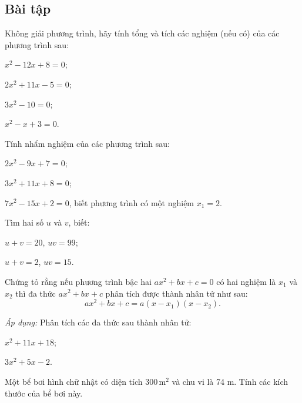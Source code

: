 \begin{exercises}
    \subsection{Bài tập}

    \begin{questions}[resume=SGK]
        \item Không giải phương trình, hãy tính tổng và tích các nghiệm (nếu có) của các phương trình sau:
        \begin{questions}
            \item $x^2-12x+8=0$;
            \item $2x^2+11x-5=0$;
            \item $3x^2-10=0$;
            \item $x^2-x+3=0$.
        \end{questions}

        \answerline
        \answerline

        \item Tính nhẩm nghiệm của các phương trình sau:
        \begin{questions}
            \item $2x^2-9x+7=0$;
            \item $3x^2+11x+8=0$;
            \item $7x^2-15x+2=0$, biết phương trình có một nghiệm $x_1=2$.
        \end{questions}

        \answerline
        \answerline

        \item Tìm hai số $u$ và $v$, biết:
        \begin{questions}
            \item $u+v=20$, $uv=99$;
            \item $u+v=2$, $uv=15$.
        \end{questions}

        \answerline
        \answerline

        \item Chứng tỏ rằng nếu phương trình bậc hai $ax^2+bx+c=0$ có hai nghiệm là $x_1$ và $x_2$ thì đa thức $ax^2+bx+c$ phân tích được thành nhân tử như sau:
        \[
            ax^2+bx+c=a(x-x_1)(x-x_2).
        \]

        \textit{Áp dụng:} Phân tích các đa thức sau thành nhân tử:
        \begin{questions}
            \item $x^2+11x+18$;
            \item $3x^2+5x-2$.
        \end{questions}

        \answerline
        \answerline
        \answerline

        \item Một bể bơi hình chữ nhật có diện tích $300\,\text{m}^2$ và chu vi là 74 m. Tính các kích thước của bể bơi này.

        \answerline
        \answerline
    \end{questions}
\end{exercises}

